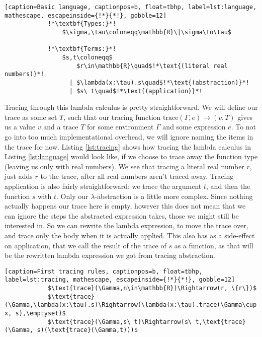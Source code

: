         \begin{lstlisting}[caption=Basic language, captionpos=b, float=tbhp, label=lst:language, mathescape, escapeinside={!*}{*!}, gobble=12]
            !*\textbf{Types:}*!
                $\sigma,\tau\coloneqq\mathbb{R}\|\sigma\to\tau$

            !*\textbf{Terms:}*!
                $s,t\coloneqq$
                    $r\in\mathbb{R}\quad$!*\text{(literal real numbers)}*!
                  | $\lambda(x:\tau).s\quad$!*\text{(abstraction)}*!
                  | $s\ t\quad$!*\text{(application)}*!
        \end{lstlisting}

        Tracing through this lambda calculus is pretty straightforward.
        We will define our trace as some set $T$, such that our tracing function $\text{trace}(\Gamma,e)\to(v,T)$ gives us a value $v$ and a trace $T$ for some environment $\Gamma$ and some expression $e$.
        To not go into too much implementational overhead, we will ignore naming the items in the trace for now.
        Listing \ref{lst:tracing} shows how tracing the lambda calculus in Listing \ref{lst:language} would look like, if we choose to trace away the function type (leaving us only with real numbers).
        We see that tracing a literal real number $r$, just adds $r$ to the trace, after all real numbers aren't traced away.
        Tracing application is also fairly straightforward: we trace the argument $t$, and then the function $s$ with $t$.
        Only our $\lambda$-abstraction is a little more complex.
        Since nothing actually happens our trace here is empty, however this does not mean that we can ignore the steps the abstracted expression takes, those we might still be interested in.
        So we can rewrite the lambda expression, to move the trace over, and trace only the body when it is actually applied.
        This also has as a side-effect on application, that we call the result of the trace of $s$ as a function, as that will be the rewritten lambda expression we got from tracing abstraction.

        \begin{lstlisting}[caption=First tracing rules, captionpos=b, float=tbhp, label=lst:tracing, mathescape, escapeinside={!*}{*!}, gobble=12]
            $\text{trace}(\Gamma,n\in\mathbb{R})\Rightarrow(r, \{r\})$
            $\text{trace}(\Gamma,\lambda(x:\tau).s)\Rightarrow(\lambda(x:\tau).trace(\Gamma\cup x, s),\emptyset)$
            $\text{trace}(\Gamma,s\ t)\Rightarrow(s\ t,\text{trace}(\Gamma, s)(\text{trace}(\Gamma,t)))$
        \end{lstlisting}

